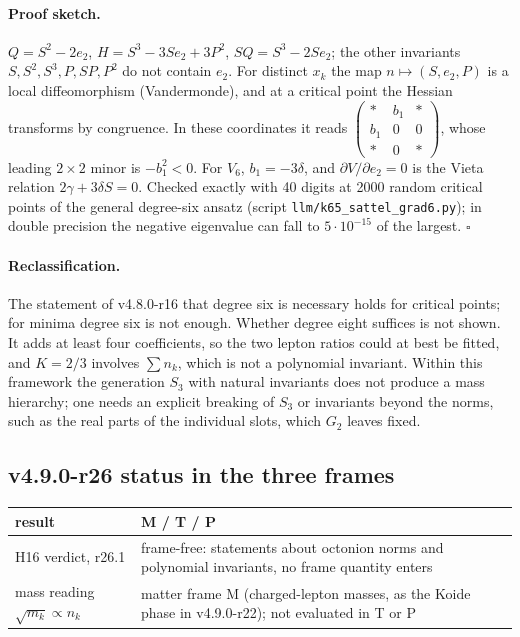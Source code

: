 \paragraph{Proof sketch.}
\(Q=S^2-2e_2\), \(H=S^3-3Se_2+3P^2\), \(SQ=S^3-2Se_2\); the other invariants \(S,S^2,S^3,P,SP,P^2\) do not contain
\(e_2\).  For distinct \(x_k\) the map \(n\mapsto(S,e_2,P)\) is a local diffeomorphism (Vandermonde), and at a critical
point the Hessian transforms by congruence.  In these coordinates it reads
\(\left(\begin{smallmatrix}\ast&b_1&\ast\\ b_1&0&0\\ \ast&0&\ast\end{smallmatrix}\right)\), whose leading
\(2\times2\) minor is \(-b_1^2<0\).  For \(V_6\), \(b_1=-3\delta\), and \(\partial V/\partial e_2=0\) is the Vieta relation
\(2\gamma+3\delta S=0\).  Checked exactly with 40 digits at 2000 random critical points of the general degree-six ansatz
(script \texttt{llm/k65\_sattel\_grad6.py}); in double precision the negative eigenvalue can fall to \(5\cdot10^{-15}\) of
the largest.  \(\square\)

\paragraph{Reclassification.}
The statement of v4.8.0-r16 that degree six is necessary holds for critical points; for minima degree six is not enough.
Whether degree eight suffices is not shown.  It adds at least four coefficients, so the two lepton ratios could at best be
fitted, and \(K=2/3\) involves \(\sum n_k\), which is not a polynomial invariant.  Within this framework the generation
\(S_3\) with natural invariants does not produce a mass hierarchy; one needs an explicit breaking of \(S_3\) or invariants
beyond the norms, such as the real parts of the individual slots, which \(G_2\) leaves fixed.

\subsection*{v4.9.0-r26 status in the three frames}
\label{subsec:v490-r26-frames}

\begin{center}
\small
\begin{tabular}{@{}>{\raggedright\arraybackslash}p{}>{\raggedright\arraybackslash}p{}@{}}
\toprule
result & M / T / P\\
\midrule
H16 verdict, r26.1 & frame-free: statements about octonion norms and polynomial invariants, no frame quantity enters\\
mass reading \(\sqrt{m_k}\propto n_k\) & matter frame M (charged-lepton masses, as the Koide phase in v4.9.0-r22); not evaluated in T or P\\
\bottomrule
\end{tabular}
\end{center}

